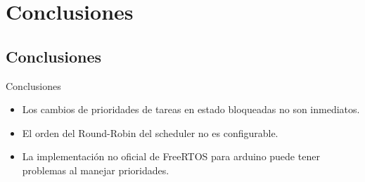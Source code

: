 \section{Conclusiones}

\subsection{Conclusiones}
\begin{frame}
	\begin{block}{Conclusiones}
		\begin{itemize}
			\item Los cambios de prioridades de tareas en estado bloqueadas no son inmediatos.
			\item El orden del Round-Robin del scheduler no es configurable.
			\item La implementación no oficial de FreeRTOS para arduino puede tener problemas al manejar prioridades.
		\end{itemize}
	\end{block}
\end{frame}